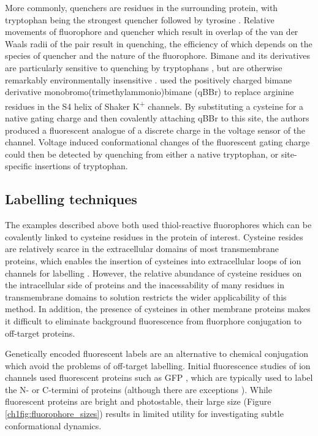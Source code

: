More commonly, quenchers are residues in the surrounding protein, with tryptophan being the strongest quencher followed by tyrosine \cite{marme_inter-_2003, lakowicz_principles_2006}.
Relative movements of fluorophore and quencher which result in overlap of the van der Waals radii of the pair result in quenching, the efficiency of which depends on the species of quencher and the nature of the fluorophore.
Bimane and its derivatives are particularly sensitive to quenching by tryptophans \cite{mansoor_distance_2010}, but are otherwise remarkably environmentally insensitive \cite{mansoor_determination_1999}.
\textcite{priest_trajectory_2020} used the positively charged bimane derivative monobromo(trimethylammonio)bimane (qBBr) to replace arginine residues in the S4 helix of Shaker K\textsuperscript{+} channels.
By substituting a cysteine for a native gating charge and then covalently attaching qBBr to this site, the authors produced a fluorescent analogue of a discrete charge in the voltage sensor of the channel.
Voltage induced conformational changes of the fluorescent gating charge could then be detected by quenching from either a native tryptophan, or site-specific insertions of tryptophan.

\subsection{Labelling techniques}

The examples described above both used thiol-reactive fluorophores which can be covalently linked to cysteine residues in the protein of interest.
Cysteine resides are relatively scarce in the extracellular domains of most transmembrane proteins, which enables the insertion of cysteines into extracellular loops of ion channels for labelling \cite{mannuzzu_direct_1996, cha_characterizing_1997, cowgill_contribution_2019, braun_current_2020}.
However, the relative abundance of cysteine residues on the intracellular side of proteins and the inacessability of many residues in transmembrane domains to solution restricts the wider applicability of this method.
In addition, the presence of cysteines in other membrane proteins makes it difficult to eliminate background fluorescence from fluorphore conjugation to off-target proteins.

Genetically encoded fluorescent labels are an alternative to chemical conjugation which avoid the problems of off-target labelling.
Initial fluorescence studies of ion channels used fluorescent proteins such as GFP \cite{siegel_genetically_1997}, which are typically used to label the N- or C-termini of proteins (although there are exceptions \cite{giraldez_generation_2005, miranda_state-dependent_2013}).
While fluorescent proteins are bright and photostable, their large size (Figure \ref{ch1fig:fluorophore_sizes}) results in limited utility for investigating subtle conformational dynamics.


